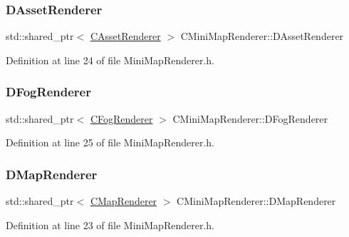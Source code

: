 \subsubsection{\texorpdfstring{D\+Asset\+Renderer}{DAssetRenderer}}
{\footnotesize\ttfamily std\+::shared\+\_\+ptr$<$ \hyperlink{classCAssetRenderer}{C\+Asset\+Renderer} $>$ C\+Mini\+Map\+Renderer\+::\+D\+Asset\+Renderer\hspace{0.3cm}{\ttfamily [protected]}}



Definition at line 24 of file Mini\+Map\+Renderer.\+h.

\hypertarget{classCMiniMapRenderer_a51a715ce4773d3fa3f433a282632035c}{}\label{classCMiniMapRenderer_a51a715ce4773d3fa3f433a282632035c} 
\subsubsection{\texorpdfstring{D\+Fog\+Renderer}{DFogRenderer}}
{\footnotesize\ttfamily std\+::shared\+\_\+ptr$<$ \hyperlink{classCFogRenderer}{C\+Fog\+Renderer} $>$ C\+Mini\+Map\+Renderer\+::\+D\+Fog\+Renderer\hspace{0.3cm}{\ttfamily [protected]}}



Definition at line 25 of file Mini\+Map\+Renderer.\+h.

\hypertarget{classCMiniMapRenderer_a6656b208c6b29641a151ea4cbcfda31b}{}\label{classCMiniMapRenderer_a6656b208c6b29641a151ea4cbcfda31b} 
\subsubsection{\texorpdfstring{D\+Map\+Renderer}{DMapRenderer}}
{\footnotesize\ttfamily std\+::shared\+\_\+ptr$<$ \hyperlink{classCMapRenderer}{C\+Map\+Renderer} $>$ C\+Mini\+Map\+Renderer\+::\+D\+Map\+Renderer\hspace{0.3cm}{\ttfamily [protected]}}



Definition at line 23 of file Mini\+Map\+Renderer.\+h.

\hypertarget{classCMiniMapRenderer_a6a4f56052a4ced356448f5f1cc9a465e}{}\label{classCMiniMapRenderer_a6a4f56052a4ced356448f5f1cc9a465e} 
